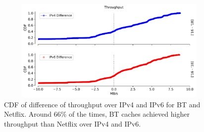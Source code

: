 \begin{figure}[!ht]
	\centering
	\includegraphics[keepaspectratio, height=5cm, width=15cm]{figures/cache/btuk/netflix-throughput-difference-2856.pdf}
	\caption[BT-UK Throughput CDF Deltas]{CDF of difference of throughput over IPv4 and IPv6 for BT and Netflix. 
Around 66\% of the times, BT caches achieved higher throughput than Netflix over IPv4 and IPv6.}
	\label{fig:BT-UK Throughput CDF Deltas}
\end{figure}

\FloatBarrier